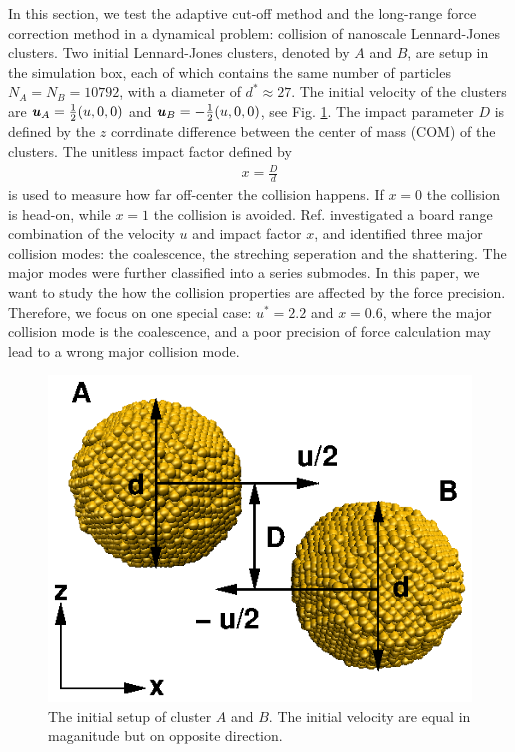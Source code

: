 \documentclass[aps,pre,preprint]{revtex4}
\renewcommand{\v}[1]{\textbf{\textit{#1}}}
\begin{document}
In this section, we test the adaptive cut-off method and the long-range force
correction method in a dynamical problem: collision of nanoscale
Lennard-Jones clusters. Two initial Lennard-Jones clusters, denoted by
$A$ and $B$, are setup in the simulation box, each of which contains
the same number of particles $N_A = N_B = 10792$, with a diameter of
$d^\ast\approx 27$. The initial velocity of the clusters are $\v u_A =
\frac12(u, 0, 0)$ and $\v u_B = -\frac12(u, 0, 0)$, see
Fig. \ref{fig:tmp7}. The impact parameter $D$ is defined by the $z$
corrdinate difference between the center of mass (COM) of the
clusters. The unitless impact factor defined by
\begin{align}
  x = \frac D d
\end{align}
is used to measure how far off-center the collision happens. If $x =
0$ the collision is head-on, while $x=1$ the collision is avoided.
Ref. \cite{kalweit2006collision} investigated a board range
combination of the velocity $u$ and impact factor $x$, and identified
three major collision modes: the coalescence, the streching seperation
and the shattering. The major modes were further classified into a
series submodes. In this paper, we want to study the how the collision
properties are affected by the force 
precision. Therefore, we focus on one special case: $u^\ast = 2.2$ and
$x = 0.6$, where the major collision mode is the coalescence, and a
poor precision of force calculation may lead to a wrong major
collision mode.

\begin{figure}
  \centering
  \includegraphics[]{fig/collision-init/init.2.eps}
  \caption{The initial setup of cluster $A$ and $B$. The initial
    velocity are equal in maganitude but on opposite direction.}
  \label{fig:tmp7}
\end{figure}
\end{document}
